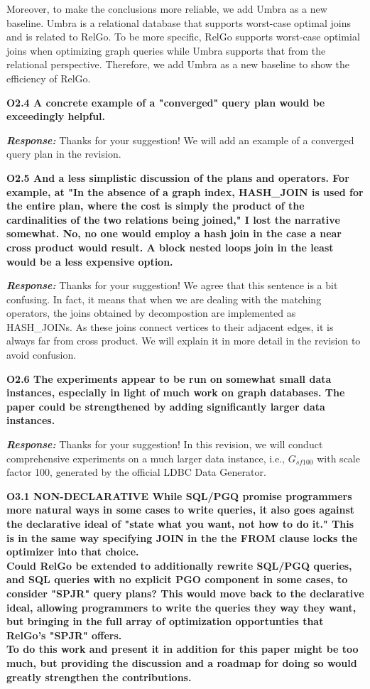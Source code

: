 Moreover, to make the conclusions more reliable, we add Umbra as a new baseline. Umbra is a relational database that supports worst-case optimal joins and is related to RelGo. To be more specific, RelGo supports worst-case optimial joins when optimizing graph queries while Umbra supports that from the relational perspective. Therefore, we add Umbra as a new baseline to show the efficiency of RelGo.


\textbf{
O2.4 A concrete example of a "converged" query plan would be exceedingly helpful.} 

\textbf{\textit{Response: }} 
Thanks for your suggestion! We will add an example of a converged query plan in the revision.


\textbf{
O2.5 And a less simplistic discussion of the plans and operators. For example, at "In the absence of a graph index, HASH\_JOIN is used for the entire plan, where the cost is simply the product of the cardinalities of the two relations being joined," I lost the narrative somewhat. No, no one would employ a hash join in the case a near cross product would result. A block nested loops join in the least would be a less expensive option. }

\textbf{\textit{Response: }}
Thanks for your suggestion! We agree that this sentence is a bit confusing. In fact, it means that when we are dealing with the matching operators, the joins obtained by decompostion are implemented as HASH\_JOINs. As these joins connect vertices to their adjacent edges, it is always far from cross product. We will explain it in more detail in the revision to avoid confusion.


\textbf{
O2.6 The experiments appear to be run on somewhat small data instances, especially in light of much work on graph databases. The paper could be strengthened by adding significantly larger data instances.}

\textbf{\textit{Response: }}
Thanks for your suggestion! In this revision, we will conduct comprehensive experiments on a much larger data instance, i.e., $G_{sf100}$ with scale factor 100, generated by the official LDBC Data Generator.


\textbf{O3.1 NON-DECLARATIVE
While SQL/PGQ promise programmers more natural ways in some cases to write queries, it also goes against the declarative ideal of "state what you want, not how to do it." This is in the same way specifying JOIN in the the FROM clause locks the optimizer into that choice. \\
Could RelGo be extended to additionally rewrite SQL/PGQ queries, and SQL queries with no explicit PGO component in some cases, to consider "SPJR" query plans? This would move back to the declarative ideal, allowing programmers to write the queries they way they want, but bringing in the full array of optimization opportunties that RelGo's "SPJR" offers. \\
To do this work and present it in addition for this paper might be too much, but providing the discussion and a roadmap for doing so would greatly strengthen the contributions.}

